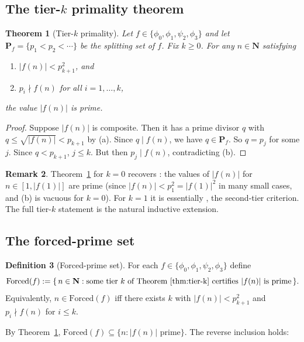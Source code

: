 \documentclass[11pt]{article}
\newtheorem{theorem}{Theorem}[section]
\theoremstyle{definition}
\newtheorem{definition}[theorem]{Definition}
\newtheorem{remark}[theorem]{Remark}
\newcommand{\N}{\mathbf{N}}
\newcommand{\PP}{\mathbf{P}}
\newcommand{\Forced}{\mathrm{Forced}}
\begin{document}
\subsection{The tier-$k$ primality theorem}

\begin{theorem}[Tier-$k$ primality]\label{thm:tier-k}
Let $f \in \{\phi_0, \phi_1, \psi_2, \phi_3\}$ and let $\PP_f = \{p_1 < p_2 < \cdots\}$ be the splitting set of $f$. Fix $k \ge 0$. For any $n \in \N$ satisfying
\begin{enumerate}
\item[(a)] $|f(n)| < p_{k+1}^2$, and
\item[(b)] $p_i \nmid f(n)$ for all $i = 1, \ldots, k$,
\end{enumerate}
the value $|f(n)|$ is prime.
\end{theorem}

\begin{proof}
Suppose $|f(n)|$ is composite. Then it has a prime divisor $q$ with $q \le \sqrt{|f(n)|} < p_{k+1}$ by (a). Since $q \mid f(n)$, we have $q \in \PP_f$. So $q = p_j$ for some $j$. Since $q < p_{k+1}$, $j \le k$. But then $p_j \mid f(n)$, contradicting (b).
\end{proof}

\begin{remark}
Theorem~\ref{thm:tier-k} for $k = 0$ recovers \cite[Theorem 1.3]{B8}: the values of $|f(n)|$ for $n \in [1, |f(1)|]$ are prime (since $|f(n)| < p_1^2 = |f(1)|^2$ in many small cases, and (b) is vacuous for $k = 0$). For $k = 1$ it is essentially \cite[Theorem 5.1, Corollary 5.3]{P2}, the second-tier criterion. The full tier-$k$ statement is the natural inductive extension.
\end{remark}

\subsection{The forced-prime set}

\begin{definition}[Forced-prime set]\label{def:forced}
For each $f \in \{\phi_0,\phi_1,\psi_2,\phi_3\}$ define
\[
\Forced(f) := \{\,n \in \N : \text{some tier $k$ of Theorem~\ref{thm:tier-k} certifies $|f(n)|$ is prime}\,\}.
\]
Equivalently, $n \in \Forced(f)$ iff there exists $k$ with $|f(n)| < p_{k+1}^2$ and $p_i \nmid f(n)$ for $i \le k$.
\end{definition}

By Theorem~\ref{thm:tier-k}, $\Forced(f) \subseteq \{n : |f(n)|\text{ prime}\}$. The reverse inclusion holds:
\end{document}
